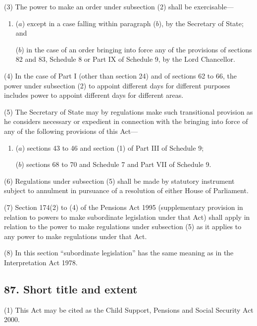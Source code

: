 \documentclass[12pt,a4paper]{article}
\begin{document}
(3) The power to make an order under subsection (2)  shall be exercisable—
\begin{enumerate}\item[]
($a$) except in a case falling within paragraph ($b$), by the Secretary of State; and

($b$) in the case of an order bringing into force any of the provisions of sections 82 and 83, Schedule 8 or Part IX of Schedule 9, by the Lord Chancellor.
\end{enumerate}

(4) In the case of Part I (other than section 24) and of sections 62 to 66, the power under subsection (2)  to appoint different days for different purposes includes power to appoint different days for different areas.

(5) The Secretary of State may by regulations make such transitional provision as he considers necessary or expedient in connection with the bringing into force of any of the following provisions of this Act—
\begin{enumerate}\item[]
($a$) sections 43 to 46 and section (1)  of Part III of Schedule 9;

($b$) sections 68 to 70 and Schedule 7 and Part VII of Schedule 9. 
\end{enumerate}

(6) Regulations under subsection (5)  shall be made by statutory instrument subject to annulment in pursuance of a resolution of either House of Parliament.

(7) Section 174(2)  to (4)  of the Pensions Act 1995 (supplementary provision in relation to powers to make subordinate legislation under that Act) shall apply in relation to the power to make regulations under subsection (5)  as it applies to any power to make regulations under that Act.

(8) In this section “subordinate legislation” has the same meaning as in the  Interpretation Act 1978. 

\subsection{87. Short title and extent}

(1) This Act may be cited as the Child Support, Pensions and Social Security Act 2000. 
\end{document}
